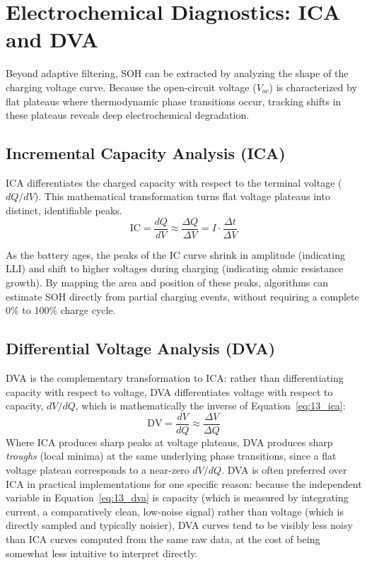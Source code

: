 \section{Electrochemical Diagnostics: ICA and DVA}
\label{sec:13_ica_dva}

Beyond adaptive filtering, SOH can be extracted by analyzing the shape of the charging voltage curve. Because the open-circuit voltage ($V_{oc}$) is characterized by flat plateaus where thermodynamic phase transitions occur, tracking shifts in these plateaus reveals deep electrochemical degradation.

\subsection{Incremental Capacity Analysis (ICA)}
\label{subsec:13_ica}

ICA differentiates the charged capacity with respect to the terminal voltage ($dQ/dV$). This mathematical transformation turns flat voltage plateaus into distinct, identifiable peaks.
\begin{equation}
    \text{IC} = \frac{dQ}{dV} \approx \frac{\Delta Q}{\Delta V} = I \cdot \frac{\Delta t}{\Delta V}
    \label{eq:13_ica}
\end{equation}



As the battery ages, the peaks of the IC curve shrink in amplitude (indicating LLI) and shift to higher voltages during charging (indicating ohmic resistance growth). By mapping the area and position of these peaks, algorithms can estimate SOH directly from partial charging events, without requiring a complete 0\% to 100\% charge cycle.

\subsection{Differential Voltage Analysis (DVA)}
\label{subsec:13_dva}

DVA is the complementary transformation to ICA: rather than differentiating capacity with respect to voltage, DVA differentiates voltage with respect to capacity, $dV/dQ$, which is mathematically the inverse of Equation~\ref{eq:13_ica}:
\begin{equation}
    \text{DV} = \frac{dV}{dQ} \approx \frac{\Delta V}{\Delta Q}
    \label{eq:13_dva}
\end{equation}
Where ICA produces sharp peaks at voltage plateaus, DVA produces sharp \emph{troughs} (local minima) at the same underlying phase transitions, since a flat voltage plateau corresponds to a near-zero $dV/dQ$. DVA is often preferred over ICA in practical implementations for one specific reason: because the independent variable in Equation~\ref{eq:13_dva} is capacity (which is measured by integrating current, a comparatively clean, low-noise signal) rather than voltage (which is directly sampled and typically noisier), DVA curves tend to be visibly less noisy than ICA curves computed from the same raw data, at the cost of being somewhat less intuitive to interpret directly.

